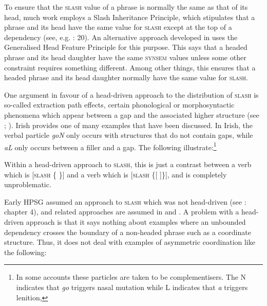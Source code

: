 \documentclass[output=paper
                ,modfonts
                ,nonflat
	        ,collection
	        ,collectionchapter
	        ,collectiontoclongg
 	        ,biblatex
                ,babelshorthands
                ,newtxmath
                ,draftmode
                ,colorlinks, citecolor=brown
]{./langsci/langscibook}
\begin{document}
{To ensure that the \textsc{slash} value of a phrase is normally the same as that
of its head, much work employs a Slash Inheritance Principle, which
stipulates that a phrase and its head have the same value for \textsc{slash}
except at the top of a dependency (see, e.g. \citealt{Bouma:Malouf:Sag:01}:
20). An alternative approach developed in \citet{Ginzburg:Sag:01} uses
the Generalised Head Feature Principle for this purpose. This says that
a headed phrase and its head daughter have the same \textsc{synsem} values unless
some other constraint requires something different. Among other things,
this ensures that a headed phrase and its head daughter normally have
the same value for \textsc{slash}.

One argument in favour of a head-driven approach to the distribution
of \textsc{slash} is so-called extraction path effects, certain phonological or
morphosyntactic phenomena which appear between a gap and the
associated higher structure (see \citealt{hukari.levine:adjunct};
\citealt[Section~3.2]{Bouma:Malouf:Sag:01}). Irish provides one of many
examples that have been discussed. In Irish, the verbal particle
\emph{goN} only occurs with structures that do not contain gaps, while
\emph{aL} only occurs between a filler and a gap. The following
illustrate:\footnote{In some accounts these particles are taken to be
  complementisers. The N indicates that \emph{go} triggers nasal
  mutation while L indicates that \emph{a} triggers lenition,}

\begin{exe} \ex \begin{xlist} \label{ex:UDC:34}

\end{xlist}
\end{exe}

\noindent
Within a head-driven approach to \textsc{slash}, this is just a contrast between a
verb which is {[}\textsc{slash} \{ \}{]} and a verb which is {[}\textsc{slash}
\{{[} {]}\}{]}, and is completely unproblematic.

Early HPSG assumed an approach to \textsc{slash} which was not
head-driven (see \citealt{Pollard:Sag:94}: chapter 4), and related
approaches are assumed in \citet{Levine:Hukari:06} and \citet{Chaves:12}.  A problem
with a head-driven approach is that it says nothing about examples
where an unbounded dependency crosses the boundary of a non-headed
phrase such as a coordinate structure. Thus, it does not deal with
examples of asymmetric coordination like the following:

}
\end{document}
